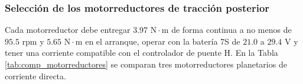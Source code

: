 \documentclass[../../General.tex]{subfiles}
\begin{document}
\subsubsection{Selección de los motorreductores de tracción posterior}

Cada motorreductor debe entregar $3.97\text{ N}\cdot\text{m}$ de forma continua a no menos de $95.5\text{ rpm}$ y $5.65\text{ N}\cdot\text{m}$ en el arranque, operar con la batería 7S de $21.0$ a $29.4\text{ V}$ y tener una corriente compatible con el controlador de puente H. En la Tabla \ref{tab:comp_motorreductores} se comparan tres motorreductores planetarios de corriente directa.

\end{document}
